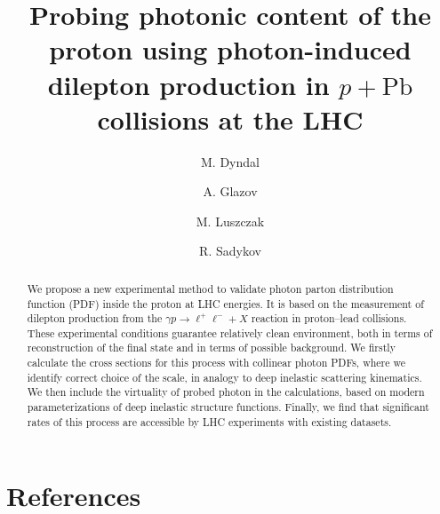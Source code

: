 \documentclass[preprint,12pt]{revtex4}
\begin{document}
\title{Probing photonic content of the proton using photon-induced dilepton production in $p+\textrm{Pb}$ collisions at the LHC}


\author{M. Dyndal}
\address{DESY}
\author{A. Glazov}
\address{DESY}
\author{M. Luszczak}
\address{...}
\author{R. Sadykov}
\address{...}



\begin{abstract}
We propose a new experimental method to validate  photon parton distribution function (PDF) inside the proton at LHC energies.
It is based on the measurement of dilepton production from the $\gamma p\rightarrow\ell^+\ell^-+X$ reaction in proton--lead collisions. These experimental conditions guarantee relatively clean environment, both in terms of reconstruction of the final state and in terms of possible background.
We firstly calculate the cross sections for this process with collinear photon PDFs, where we identify correct choice of the scale, in analogy to deep inelastic scattering kinematics.
We then include the virtuality of probed photon in the calculations, based on modern parameterizations of deep inelastic structure functions.
Finally, we find that significant rates of this process are accessible by LHC experiments with existing datasets.
\end{abstract}




\maketitle










\FloatBarrier




\section*{References}


\end{document}

